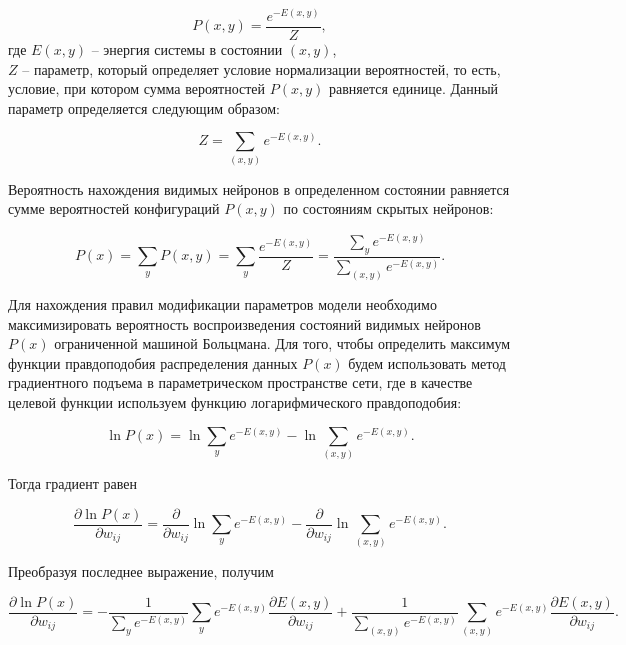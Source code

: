 \begin{equation*}
	P(x, y)=\frac{e^{-E(x,y)}}{Z},
\end{equation*}
где $E(x,y)$ -- энергия системы в состоянии $(x,y)$,\\
$Z$ -- параметр, который определяет условие нормализации вероятностей, то есть, условие, при котором сумма вероятностей $P(x, y)$ равняется единице. Данный параметр определяется следующим образом:
	
\begin{equation*}
	Z=\sum_{(x,y)} e^{-E(x,y)}.
\end{equation*}
	
Вероятность нахождения видимых нейронов в определенном состоянии равняется сумме вероятностей  конфигураций $P(x,y)$ по состояниям скрытых нейронов:
	
\begin{equation*}
	P(x)=\sum_y P(x,y)=\sum_y \frac{e^{-E(x,y)}}{Z}=\frac{\sum_y e^{-E(x,y)}}{\sum_{(x,y)} e^{-E(x,y)}}.
\end{equation*}
	
Для нахождения правил модификации параметров модели необходимо максимизировать вероятность воспроизведения состояний видимых нейронов $P(x)$ ограниченной машиной Больцмана. Для того, чтобы определить максимум функции правдоподобия распределения данных $P(x)$ будем использовать метод градиентного подъема в параметрическом пространстве сети, где в качестве целевой функции используем функцию логарифмического правдоподобия:
	
\begin{equation*}
	\ln P(x)=\ln \sum_y e^{-E(x,y)}-\ln \sum_{(x,y)} e^{-E(x,y)}.
\end{equation*}
	
Тогда градиент равен
	
\begin{equation*}
	\frac{\partial \ln P(x)}{\partial w_{ij}}=\frac{\partial}{\partial w_{ij}}\ln \sum_y e^{-E(x,y)}-\frac{\partial}{\partial w_{ij}}\ln\sum_{(x,y)} e^{-E(x,y)}.
\end{equation*}
	
Преобразуя последнее выражение, получим
	
\begin{equation*}
	\frac{\partial \ln P(x)}{\partial w_{ij}}=-\frac{1}{\sum_y e^{-E(x,y)}}\sum_y e^{-E(x,y)}\frac{\partial E(x,y)}{\partial w_{ij}}+\frac{1}{\sum_{(x,y)} e^{-E(x,y)}}\sum_{(x,y)} e^{-E(x,y)}\frac{\partial E(x,y)}{\partial w_{ij}}.
\end{equation*}
	
